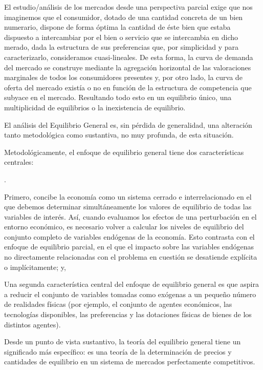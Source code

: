 \documentclass[10pt,a4paper]{article}
\newcounter{numitem}
\newenvironment{lnum}
      {\begin{list}{\arabic{numitem}.}{%
          \usecounter{numitem}%
          \setlength{\leftmargin}{1cm}%
          \setlength{\parskip}{3pt}%
          \setlength{\itemsep}{0pt}%
          \setlength{\parsep}{0pt}%
      }}
      {\end{list}}
\begin{document}
El estudio/análisis de los mercados desde una perspectiva parcial exige que nos imaginemos que el consumidor, dotado de una cantidad concreta de un bien numerario, dispone de forma óptima la cantidad de éste bien que estaba dispuesto a intercambiar por el bien o servicio que se intercambia en dicho merado, dada la estructura de sus preferencias que, por simplicidad y para caracterizarlo, consideramos cuasi-lineales. De esta forma, la curva de demanda del mercado se construye mediante la agregación horizontal de las valoraciones marginales de todos los consumidores presentes y, por otro lado, la curva de oferta del mercado existía o no en función de la estructura de competencia que subyace en el mercado. Resultando todo esto en un equilibrio único, una multiplicidad de equilibrios o la inexistencia de equilibrio. 

El análisis del Equilibrio General es, sin pérdida de generalidad, una alteración tanto metodológica como sustantiva, no muy profunda, de esta situación.

Metodológicamente, el enfoque de equilibrio general tiene dos características centrales:
\begin{lnum}
    \item Primero, concibe la economía como un sistema cerrado e interrelacionado en el que debemos determinar simultáneamente los valores de equilibrio de todas las variables de interés. Así, cuando evaluamos los efectos de una perturbación en el entorno económico, es necesario volver a calcular los niveles de equilibrio del conjunto completo de variables endógenas de la economía. Esto contrasta con el enfoque de equilibrio parcial, en el que el impacto sobre las variables endógenas no directamente relacionadas con el problema en cuestión se desatiende explícita o implícitamente; y,
    \item Una segunda característica central del enfoque de equilibrio general es que aspira a reducir el conjunto de variables tomadas como exógenas a un pequeño número de realidades físicas (por ejemplo, el conjunto de agentes económicos, las tecnologías disponibles, las preferencias y las dotaciones físicas de bienes de los distintos agentes).
\end{lnum}

Desde un punto de vista sustantivo, la teoría del equilibrio general tiene un significado más específico: es una teoría de la determinación de precios y cantidades de equilibrio en un sistema de mercados perfectamente competitivos. 
\end{document}

